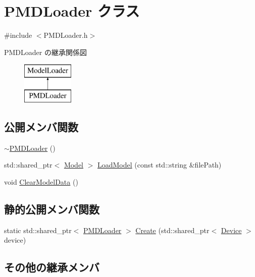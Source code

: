 \hypertarget{class_p_m_d_loader}{}\section{P\+M\+D\+Loader クラス}
\label{class_p_m_d_loader}


{\ttfamily \#include $<$P\+M\+D\+Loader.\+h$>$}

P\+M\+D\+Loader の継承関係図\begin{figure}[H]
\begin{center}
\leavevmode
\includegraphics[height=2.000000cm]{class_p_m_d_loader}
\end{center}
\end{figure}
\subsection*{公開メンバ関数}
\begin{DoxyCompactItemize}
\item 
\mbox{\hyperlink{class_p_m_d_loader_a9a784c2a2700ee01b6c1e8139a876fa1}{$\sim$\+P\+M\+D\+Loader}} ()
\item 
std\+::shared\+\_\+ptr$<$ \mbox{\hyperlink{class_model}{Model}} $>$ \mbox{\hyperlink{class_p_m_d_loader_ae1da98c6236a58940ec521521e5c8288}{Load\+Model}} (const std\+::string \&file\+Path)
\item 
void \mbox{\hyperlink{class_p_m_d_loader_abdb6e537aef759341dfc62cd1038539c}{Clear\+Model\+Data}} ()
\end{DoxyCompactItemize}
\subsection*{静的公開メンバ関数}
\begin{DoxyCompactItemize}
\item 
static std\+::shared\+\_\+ptr$<$ \mbox{\hyperlink{class_p_m_d_loader}{P\+M\+D\+Loader}} $>$ \mbox{\hyperlink{class_p_m_d_loader_a82a5b173f9f2e05662174452cfde5578}{Create}} (std\+::shared\+\_\+ptr$<$ \mbox{\hyperlink{class_device}{Device}} $>$ device)
\end{DoxyCompactItemize}
\subsection*{その他の継承メンバ}


